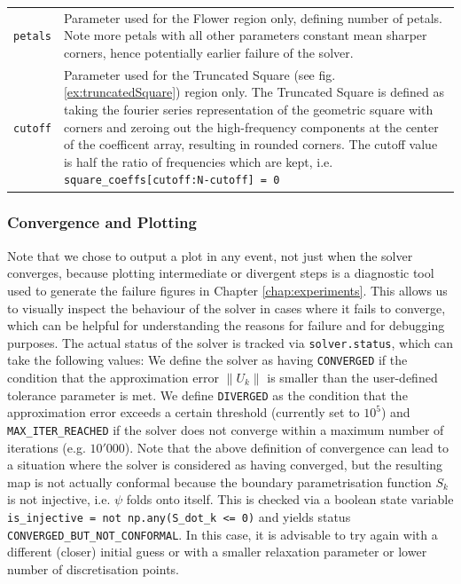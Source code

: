 \begin{tabular}{ p{} | p{} }
    \texttt{petals} & Parameter used for the Flower region only, defining number of petals. Note more petals with all other parameters constant mean sharper corners, hence potentially earlier failure of the solver. \\
    \texttt{cutoff} & Parameter used for the Truncated Square (see fig. \ref{ex:truncatedSquare}) region only. The Truncated Square is defined as taking the fourier series representation of the geometric square with corners and zeroing out the high-frequency components at the center of the coefficent array, resulting in rounded corners. The cutoff value is half the ratio of frequencies which are kept, i.e. \texttt{square\_coeffs[cutoff:N-cutoff] = 0}\\
\end{tabular}
\endgroup 
\bigskip

\subsubsection{Convergence and Plotting}
Note that we chose to output a plot in any event, not just when the solver converges, because plotting intermediate or divergent steps is a diagnostic tool used to generate the failure figures in Chapter \ref{chap:experiments}. This allows us to visually inspect the behaviour of the solver in cases where it fails to converge, which can be helpful for understanding the reasons for failure and for debugging purposes.
The actual status of the solver is tracked via \texttt{solver.status}, which can take the following values:
We define the solver as having \texttt{CONVERGED} if the condition that the approximation error $\lVert U_k \rVert$ is smaller than the user-defined tolerance parameter is met. We define \texttt{DIVERGED} as the condition that the approximation error exceeds a certain threshold (currently set to $10^5$) and \texttt{MAX\_ITER\_REACHED} if the solver does not converge within a maximum number of iterations (e.g. $10'000$).
Note that the above definition of convergence can lead to a situation where the solver is considered as having converged, but the resulting map is not actually conformal because the boundary parametrisation function $S_k$ is not injective, i.e. $\psi$ folds onto itself. This is checked via a boolean state variable \texttt{is\_injective = not np.any(S\_dot\_k <= 0)} and yields status \texttt{CONVERGED\_BUT\_NOT\_CONFORMAL}. 
In this case, it is advisable to try again with a different (closer) initial guess or with a smaller relaxation parameter or lower number of discretisation points.

